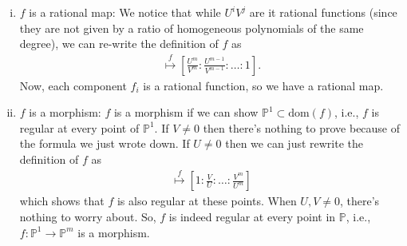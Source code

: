 \documentclass[12pt]{article}
\newcommand{\f}[2]{\frac{#1}{#2}}
\begin{document}
\begin{enumerate}[(i)]
	\item $f$ is a rational map: We notice that while $U^i V^j$ are it rational functions (since they are not given by a ratio of homogeneous polynomials of the same degree), we can re-write the definition of $f$ as
	\begin{align*}
	[U:V] \stackrel{f}{\mapsto} \left[ \f{U^m}{V^m} : \f{U^{m-1}}{V^{m-1}}: \dots : 1 \right].
	\end{align*}
	Now, each component $f_i$ is a rational function, so we have a rational map.
	
	
	\item $f$ is a morphism: $f$ is a morphism if we can show $\mathbb{P}^1 \subset \mbox{dom}(f)$, i.e., $f$ is regular at every point of $\mathbb{P}^1$. If $V\neq 0$ then there's nothing to prove because of the formula we just wrote down. If $U\neq 0$ then we can just rewrite the definition of $f$ as
	\begin{align*}
	[U:V] \stackrel{f}{\mapsto} \left[1 : \f{V}{U} : \dots  : \f{V^m}{U^m}\right]
	\end{align*} 
	which shows that $f$ is also regular at these points. When $U,V\neq 0$, there's nothing to worry about. So, $f$ is indeed regular at every point in $\mathbb{P}$, i.e., $f : \mathbb{P}^1 \to \mathbb{P}^m$ is a morphism.
	

\end{enumerate}
\end{document}
